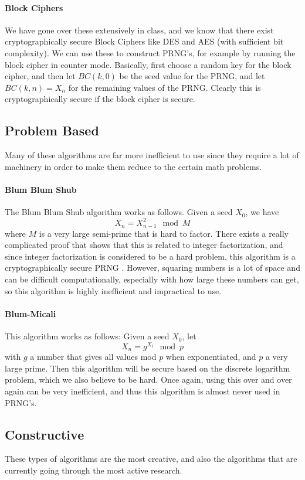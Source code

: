 \documentclass[11pt]{article}
\begin{document}
\paragraph{Block Ciphers} We have gone over these extensively in class, and we know that there exist cryptographically secure Block Ciphers like DES and AES (with sufficient bit complexity). We can use these to construct PRNG's, for example by running the block cipher in counter mode. Basically, first choose a random key for the block cipher, and then let $BC(k, 0)$ be the seed value for the PRNG, and let $BC(k, n) = X_n$ for the remaining values of the PRNG. Clearly this is cryptographically secure if the block cipher is secure. 
\subsection{Problem Based}
Many of these algorithms are far more inefficient to use since they require a lot of machinery in order to make them reduce to the certain math problems.
\paragraph{Blum Blum Shub \cite{BBS}} The Blum Blum Shub algorithm works as follows. Given a seed $X_0$, we have $$X_n = X_{n-1}^2 \mod M$$ where $M$ is a very large semi-prime that is hard to factor. There exists a really complicated proof that shows that this is related to integer factorization, and since integer factorization is considered to be a hard problem, this algorithm is a cryptographically secure PRNG \cite{BBS}. However, squaring numbers is a lot of space and can be difficult computationally, especially with how large these numbers can get, so this algorithm is highly inefficient and impractical to use. 
\paragraph{Blum-Micali} This algorithm works as follows: Given a seed $X_0$, let $$X_n = g^{X_i} \mod p$$ with $g$ a number that gives all values mod $p$ when exponentiated, and $p$ a very large prime. Then this algorithm will be secure based on the discrete logarithm problem, which we also believe to be hard. Once again, using this over and over again can be very inefficient, and thus this algorithm is almost never used in PRNG's.
\subsection{Constructive}
These types of algorithms are the most creative, and also the algorithms that are currently going through the most active research. 
\end{document}
